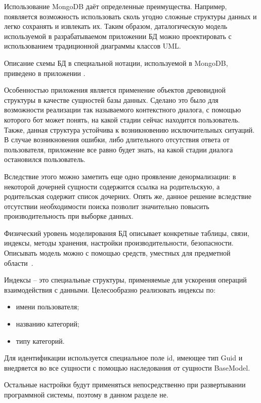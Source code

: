 Использование MongoDB даёт определенные преимущества. Например, появляется возможность использовать сколь угодно сложные структуры данных и легко сохранять и извлекать их. Таким образом, даталогическую модель используемой в разрабатываемом приложении БД можно проектировать с использованием традиционной диаграммы классов UML.

Описание схемы БД в специальной нотации, используемой в \linebreak MongoDB, приведено в приложении \dbschemeappendix.

Особенностью приложения является применение объектов древовидной структуры в качестве сущностей базы данных. Сделано это было для возможности реализации так называемого контекстного диалога, с помощью которого бот может понять, на какой стадии сейчас находится пользователь. Также, данная структура устойчива к возникновению исключительных ситуаций. В случае возникновения ошибки, либо длительного отсутствия ответа от пользователя, приложение все равно будет знать, на какой стадии диалога остановился пользователь. 

Вследствие этого можно заметить еще одно проявление денормализации: в некоторой дочерней сущности содержится ссылка на родительскую, а родительская содержит список дочерних. Опять же, данное решение вследствие отсутствии необходимости поиска позволит значительно повысить производительность при выборке данных.

Физический уровень моделирования БД описывает конкретные таблицы, связи, индексы, методы хранения, настройки производительности, безопасности. Описывать модель можно с помощью средств, уместных для предметной области~\cite{kulikov_db_workbook}. 

Индексы -- это специальные структуры, применяемые для ускорения операций взаимодействия с данными. Целесообразно реализовать индексы по:

\begin{itemize}
	\item имени пользователя;
	\item названию категорий;
	\item типу категорий.
\end{itemize}

Для идентификации используется специальное поле id, имеющее тип Guid и внедряется во все сущности с помощью наследования от сущности BaseModel.

Остальные настройки будут применяться непосредственно при развертывании программной системы, поэтому в данном разделе не.
